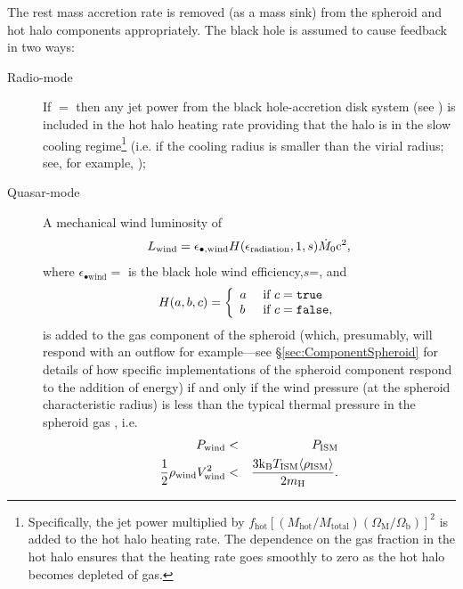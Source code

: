The rest mass accretion rate is removed (as a mass sink) from the spheroid and hot halo components appropriately. The black hole is assumed to cause feedback in two ways:
\begin{description}
 \item [Radio-mode] If \mono{[blackHoleHeatsHotHalo]}$=$ then any jet power from the black hole-accretion disk system (see ) is included in the hot halo heating rate providing that the halo is in the slow cooling regime\footnote{Specifically, the jet power multiplied by $f_\mathrm{hot} [(M_\mathrm{hot}/M_\mathrm{total}) (\Omega_\mathrm{M}/\Omega_\mathrm{b})]^2$ is added to the hot halo heating rate. The dependence on the gas fraction in the hot halo ensures that the heating rate goes smoothly to zero as the hot halo becomes depleted of gas.} (i.e. if the cooling radius is smaller than the virial radius; see, for example, \citealt{benson_cold_2010});
 \item [Quasar-mode] A mechanical wind luminosity of \citep{ostriker_momentum_2010}
\begin{equation}
 L_\mathrm{wind} = \epsilon_{\bullet, \mathrm{wind}} H(\epsilon_\mathrm{radiation},1,s) \dot{M}_0 \mathrm{c}^2,
\end{equation}
where $\epsilon_{\bullet \mathrm{wind}}=$\mono{[blackHoleWindEfficiency]} is the black hole wind efficiency,\newline $s$=, and
\begin{equation}
H(a,b,c) = \left\{\begin{array}{ll}a & \hbox{ if } c=\hbox\mono{true} \\b & \hbox{ if } c=\hbox\mono{false},\end{array}\right.
\end{equation}
is added to the gas \gls{component} of the spheroid (which, presumably, will respond with an outflow for example---see \S\ref{sec:ComponentSpheroid} for details of how specific implementations of the spheroid component respond to the addition of energy) if and only if the wind pressure (at the spheroid characteristic radius) is less than the typical thermal pressure in the spheroid gas \citep{ciotti_feedbackcentral_2009}, i.e.
\begin{eqnarray}
 P_\mathrm{wind} &<& P_\mathrm{ISM} \nonumber \\
 \frac{1}{2}\rho_\mathrm{wind} V_\mathrm{wind}^2 &<& {3 \mathrm{k_B} T_\mathrm{ISM} \langle \rho_\mathrm{ISM}\rangle \over 2 m_\mathrm{H}}.

\end{eqnarray}
\end{description}
